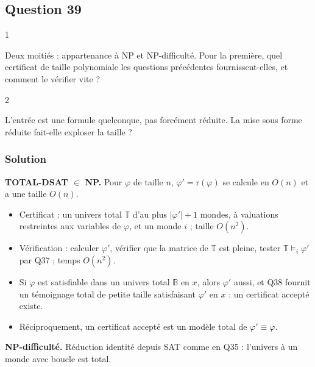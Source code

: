 \documentclass[11pt,a4paper]{article}
\providecommand{\tightlist}{\setlength{\itemsep}{0pt}\setlength{\parskip}{0pt}}
\begin{document}
\hypertarget{question-39}{%
\subsection{Question 39}\label{question-39}}

\begin{indication}{1}

Deux moitiés : appartenance à NP et NP-difficulté. Pour la première, quel certificat de taille polynomiale les questions précédentes fournissent-elles, et comment le vérifier vite ?

\end{indication}

\begin{indication}{2}

L'entrée est une formule quelconque, pas forcément réduite. La mise sous forme réduite fait-elle exploser la taille ?

\end{indication}

\hypertarget{solution-38}{%
\subsubsection{Solution}\label{solution-38}}

\textbf{TOTAL-DSAT \(\in\) NP.} Pour \(\varphi\) de taille \(n\), \(\varphi'=\mathrm r(\varphi)\) se calcule en \(O(n)\) et a une taille \(O(n)\).

\begin{itemize}
\tightlist
\item
  Certificat : un univers total \(\mathbb T\) d'au plus \(|\varphi'|+1\) mondes, à valuations restreintes aux variables de \(\varphi\), et un monde \(i\) ; taille \(O(n^2)\).
\item
  Vérification : calculer \(\varphi'\), vérifier que la matrice de \(\mathbb T\) est pleine, tester \(\mathbb T\models_i\varphi'\) par Q37 ; temps \(O(n^2)\).
\item
  Si \(\varphi\) est satisfiable dans un univers total \(\mathbb B\) en \(x\), alors \(\varphi'\) aussi, et Q38 fournit un témoignage total de petite taille satisfaisant \(\varphi'\) en \(x\) : un certificat accepté existe.
\item
  Réciproquement, un certificat accepté est un modèle total de \(\varphi'\equiv\varphi\).
\end{itemize}

\textbf{NP-difficulté.} Réduction identité depuis SAT comme en Q35 : l'univers à un monde avec boucle est total.
\end{document}
